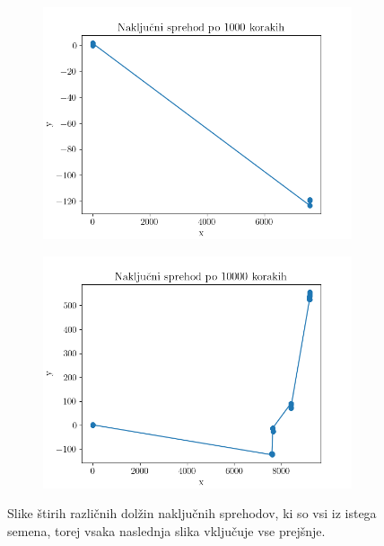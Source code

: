 \documentclass[12pt]{article}
\begin{document}
\begin{figure}
\begin{subfigure}{0.49\textwidth}
        \includegraphics[width=\textwidth]{Random1000.png}
    \end{subfigure}
    \begin{subfigure}{0.49\textwidth}
        \includegraphics[width=\textwidth]{Random10000.png}
    \end{subfigure}
    \caption{\label{fig:random} Slike štirih različnih dolžin naključnih sprehodov, ki so vsi iz istega semena, torej vsaka naslednja slika vključuje vse prejšnje.}
\end{figure}

\newpage
\end{document}
